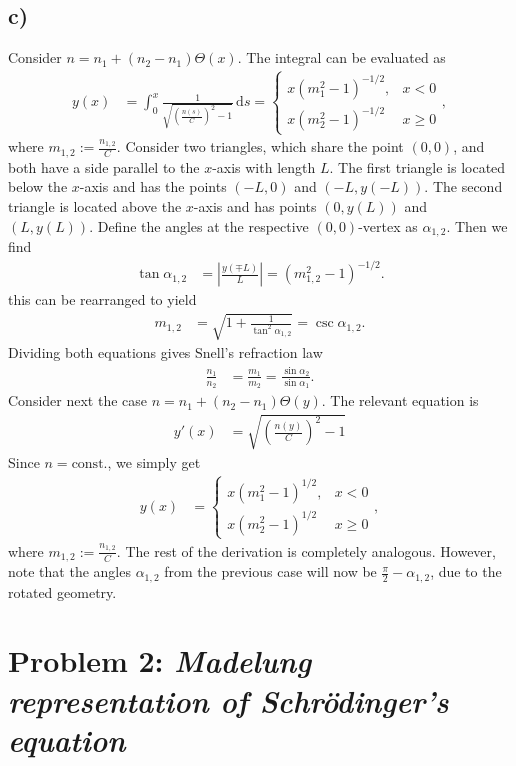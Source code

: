 \documentclass[english, parskip=full]{scrartcl}
\newcommand{\intx}{}
\newcommand{\kla}{}
\newcommand{\tecxt}{}
\begin{document}
\subsection*{c)}
Consider $n=n_1+(n_2-n_1)\Theta(x)$.
The integral can be evaluated as
\begin{align}
y(x)&=\intx\int_{0}^{x}\frac{1}{\sqrt{\kla\left( \frac{n(s)}{C} \right)^2-1}}\, \mathrm{d}s=
\begin{cases}x\kla\left( m_1^2-1 \right)^{-1/2},&x<0\\
x\kla\left( m_2^2-1 \right)^{-1/2}&x\ge 0
\end{cases},
\end{align}
where $m_{1,2}:=\frac{n_{1,2}}{C}$.
Consider two triangles, which share the point $(0,0)$, and both have a side parallel to the $x$-axis with length $L$.
The first triangle is located below the $x$-axis and has the points $(-L,0)$ and $(-L, y(-L))$. 
The second triangle is located above the $x$-axis and has points $(0,y(L))$ and $(L,y(L))$.
Define the angles at the respective $(0,0)$-vertex as $\alpha_{1,2}$.
Then we find
\begin{align}
\tan\alpha_{1,2}&=\left\vert\frac{y(\mp L)}{L}\right\vert = \kla\left( m_{1,2}^2-1 \right)^{-1/2}.
\end{align}
this can be rearranged to yield
\begin{align}
m_{1,2}&=\sqrt{1+\frac{1}{\tan^2\alpha_{1,2}}}=\csc\alpha_{1,2}.
\end{align}
Dividing both equations gives Snell's refraction law
\begin{align}
\frac{n_1}{n_2}&=\frac{m_1}{m_2}=\frac{\sin\alpha_2}{\sin\alpha_1}.
\end{align}
Consider next the case $n=n_1+(n_2-n_1)\Theta(y)$.
The relevant equation is
\begin{align}
y'(x)&=\sqrt{\kla\left( \frac{n(y)}{C} \right)^2-1}
\end{align}
Since $n=\tecxt\text{const.}$, we simply get
\begin{align}
y(x)&= \begin{cases} x\kla\left( m_1^2-1 \right)^{1/2},&x<0\\
x\kla\left( m_2^2-1 \right)^{1/2}&x\ge 0
\end{cases},
\end{align}
where $m_{1,2}:=\frac{n_{1,2}}{C}$.
The rest of the derivation is completely analogous.
However, note that the angles $\alpha_{1,2}$ from the previous case will now be $\frac{\pi}{2}-\alpha_{1,2}$, due to the rotated geometry.
\newpage
\section*{Problem 2: \normalfont\textit{\large{Madelung representation of Schrödinger's equation}}}
\end{document}

